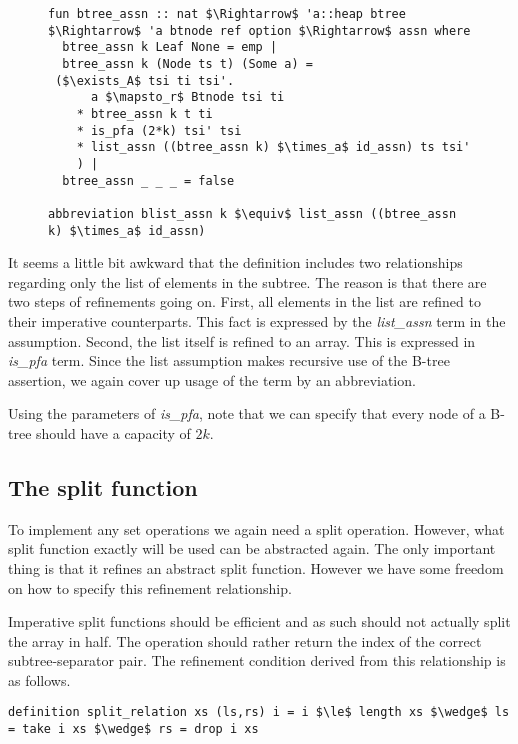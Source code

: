 \begin{figure}
\begin{lstlisting}[mathescape=true, language=Isabelle, caption={The refinement assertion for B-trees},
    label={lst:imp-btree-refine}]
fun btree_assn :: nat $\Rightarrow$ 'a::heap btree $\Rightarrow$ 'a btnode ref option $\Rightarrow$ assn where
  btree_assn k Leaf None = emp |
  btree_assn k (Node ts t) (Some a) = 
 ($\exists_A$ tsi ti tsi'.
      a $\mapsto_r$ Btnode tsi ti
    * btree_assn k t ti
    * is_pfa (2*k) tsi' tsi
    * list_assn ((btree_assn k) $\times_a$ id_assn) ts tsi'
    ) |
  btree_assn _ _ _ = false

abbreviation blist_assn k $\equiv$ list_assn ((btree_assn k) $\times_a$ id_assn)

\end{lstlisting}
\end{figure}

It seems a little bit awkward that the definition
includes two relationships regarding only the list of elements in the subtree.
The reason is that there are two steps of refinements going on.
First, all elements in the list are refined to their imperative counterparts.
This fact is expressed by the \textit{list\_assn} term in the assumption.
Second, the list itself is refined to an array.
This is expressed in \textit{is\_pfa} term.
Since the list assumption makes recursive use of the
B-tree assertion, we again cover up usage of the term
by an abbreviation.

Using the parameters of \textit{is\_pfa},
note that we can specify that every node of a B-tree should have
a capacity of $2k$.

\subsection{The split function}
\label{sec:imp-split}

To implement any set operations we again need a split operation.
However, what split function exactly will be used can be abstracted again.
The only important thing is that it refines an abstract split function.
However we have some freedom on how to specify this refinement relationship.

Imperative split functions should be efficient and as such should not actually
split the array in half.
The operation should rather return the index of the correct
subtree-separator pair.
The refinement condition derived from this relationship is as follows.

\begin{lstlisting}[mathescape=true, language=Isabelle]
definition split_relation xs (ls,rs) i = i $\le$ length xs $\wedge$ ls = take i xs $\wedge$ rs = drop i xs
\end{lstlisting}

